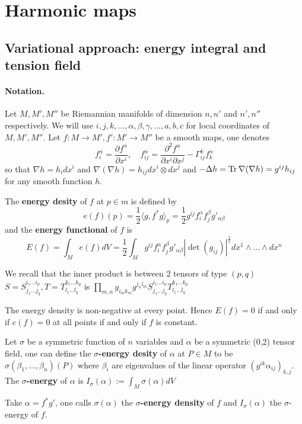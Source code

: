 \section{Harmonic maps}
\label{sec:org609c41e}
\subsection{Variational approach: energy integral and tension field}
\label{sec:org138fa59}
\paragraph{Notation.}
\label{sec:orgf84efe8}
Let \(M, M', M''\) be Riemannian manifolds of dimension \(n, n'\) and \(n', n''\)
respectively. We will use \(i,j,k,\dots, \alpha,\beta,\gamma,\dots, a,b,c\) for local
coordinates of \(M, M', M''\).
Let \(f: M \longrightarrow M', f': M' \longrightarrow M''\) be a smooth maps, one denotes
\[
f^\alpha_i = \frac{\partial f^\alpha}{\partial x^i},\quad f^\alpha_{ij} =
\frac{\partial^2 f^\alpha}{\partial x^i \partial x^j} - \Gamma_{ij}^k f^{\alpha}_k \]
so that \(\nabla h = h_i dx^i\) and \(\nabla (\nabla h) = h_{ij}dx^i\otimes dx^j\) and
\(-\Delta h = \mathop{\rm Tr}\nolimits \nabla (\nabla h) = g^{ij}h_{ij}\) for any smooth function \(h\).


\begin{definition}
The \textbf{energy desity} of \(f\) at \(p\in m\) is defined by
\[
e(f)(p) = \frac{1}{2}\langle g, f^*g \rangle_p = \frac{1}{2}g^{ij}f^\alpha_i
f^\beta_j g'_{\alpha\beta}
\]
and the \textbf{energy functional} of \(f\) is
\[
E(f) = \int_M e(f) dV = \frac{1}{2}\int_M g^{ij}f^\alpha_i
f^\beta_j g'_{\alpha\beta} |\det (g_{ij})|^\frac{1}{2} dx^1\wedge \dots\wedge dx^n
\]
\end{definition}

We recall that the inner product is between 2 tensors of type \((p,q)\) \(S =
S^{i_1\dots i_p}_{j_1\dots j_q}, T = T^{k_1\dots k_p}_{l_1\dots l_q}\) is \(\prod_{m,n}
g_{i_m k_m} g^{j_n l_m}S^{i_1\dots i_p}_{j_1\dots j_q} T^{k_1\dots k_p}_{l_1\dots l_q}\)

\begin{remark}
The energy density is non-negative at every point. Hence \(E(f) = 0\) if and only if \(e(f)=0\) at all points if and only if \(f\) is constant.
\end{remark}

\begin{definition}
Let \(\sigma\) be a symmetric function of \(n\) variables and \(\alpha\) be a
symmetric (0,2) tensor field, one can define the \textbf{\(\sigma\)-energy desity} of \(\alpha\) at \(P\in M\) to be \(\sigma
(\beta_1,\dots,\beta_n)(P)\) where \(\beta_i\) are eigenvalues of the linear operator
\((g^{ik}\alpha_{ij})_{k,j}\). The \textbf{\(\sigma\)-energy} of \(\alpha\) is \(I_\sigma(\alpha)
:= \int_M  \sigma(\alpha) dV\)

Take \(\alpha = f^*g'\), one calls \(\sigma(\alpha)\) the \textbf{\(\sigma\)-energy density}
of \(f\) and \(I_\sigma(\alpha)\) the \(\sigma\)-energy of \(f\).
\end{definition}

